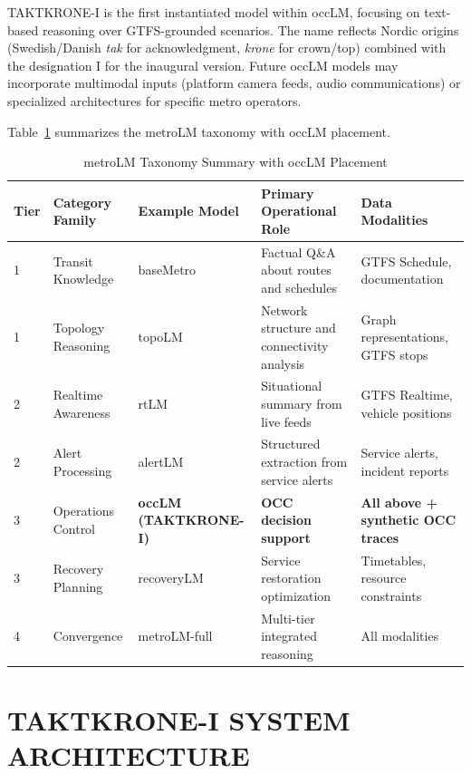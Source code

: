 \documentclass{IEEEoj}
\begin{document}
TAKTKRONE-I is the first instantiated model within occLM, focusing on text-based reasoning over GTFS-grounded scenarios. The name reflects Nordic origins (Swedish/Danish \textit{tak} for acknowledgment, \textit{krone} for crown/top) combined with the designation I for the inaugural version. Future occLM models may incorporate multimodal inputs (platform camera feeds, audio communications) or specialized architectures for specific metro operators.

Table~\ref{tab:taxonomy} summarizes the metroLM taxonomy with occLM placement.

\begin{table}[t]
\centering
\caption{metroLM Taxonomy Summary with occLM Placement}
\label{tab:taxonomy}
\begin{tabular}{@{}lllll@{}}
\toprule
\textbf{Tier} & \textbf{Category Family} & \textbf{Example Model} & \textbf{Primary Operational Role} & \textbf{Data Modalities} \\
\midrule
1 & Transit Knowledge & baseMetro & Factual Q\&A about routes and schedules & GTFS Schedule, documentation \\
1 & Topology Reasoning & topoLM & Network structure and connectivity analysis & Graph representations, GTFS stops \\
2 & Realtime Awareness & rtLM & Situational summary from live feeds & GTFS Realtime, vehicle positions \\
2 & Alert Processing & alertLM & Structured extraction from service alerts & Service alerts, incident reports \\
3 & Operations Control & \textbf{occLM (TAKTKRONE-I)} & \textbf{OCC decision support} & \textbf{All above + synthetic OCC traces} \\
3 & Recovery Planning & recoveryLM & Service restoration optimization & Timetables, resource constraints \\
4 & Convergence & metroLM-full & Multi-tier integrated reasoning & All modalities \\
\bottomrule
\end{tabular}
\end{table}

\section{TAKTKRONE-I SYSTEM ARCHITECTURE}
\label{sec:architecture}
\end{document}
